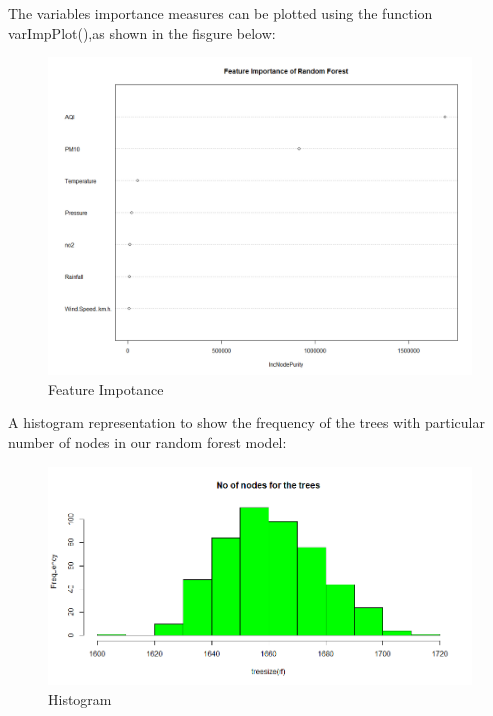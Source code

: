 The variables importance measures can be plotted using the function varImpPlot(),as shown in the fisgure below:
\begin{figure}[h]
\label{ss}
\centering
\includegraphics[width= 10 cm]{rf_freature_importence.png}
\caption{Feature Impotance}
\end{figure} 
\linebreak
A histogram representation to show the frequency of the trees with particular number of nodes in our random forest model:\linebreak
\begin{figure}[h]
\label{ss}
\centering
\includegraphics[width= 11 cm]{rf_no_of_nodes_for_the_trees.png}
\caption{Histogram}
\end{figure}\pagebreak

